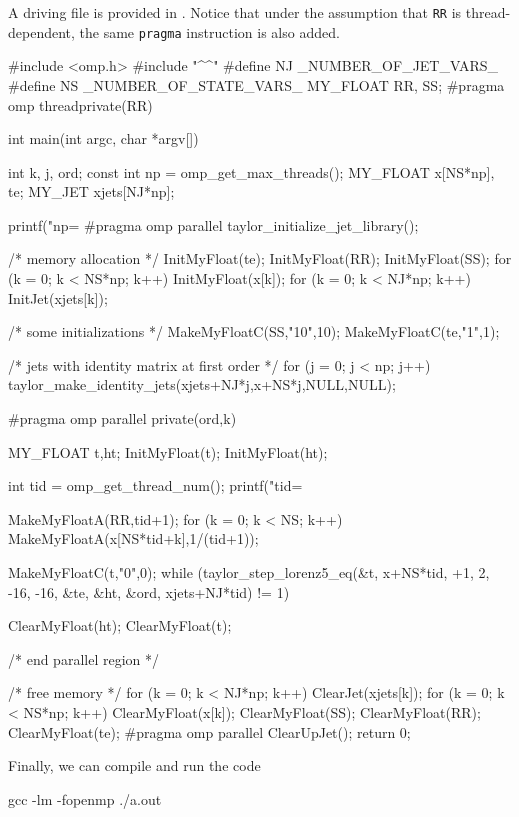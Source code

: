 \documentclass[10pt]{article}
\theoremstyle{remark}
\newcommand{\mainfile}{}
\newcommand{\odecfile}{}
\newcommand{\odehfile}{}
\begin{document}
\medskip
A driving file is provided in \mainfile{}. Notice that under the
assumption that \verb+RR+ is thread-dependent, the same \verb+pragma+
instruction is also added.

\begin{code}[title={File: \mainfile{}}]
    #include <omp.h>
    #include "^\odehfile{}^"
    #define NJ _NUMBER_OF_JET_VARS_
    #define NS _NUMBER_OF_STATE_VARS_
    MY_FLOAT RR, SS;
    #pragma omp threadprivate(RR)
    
    int main(int argc, char *argv[])
    {
      int k, j, ord;
      const int np = omp_get_max_threads();
      MY_FLOAT x[NS*np], te;
      MY_JET xjets[NJ*np];
    
      printf("np=%
    #pragma omp parallel
      taylor_initialize_jet_library();
      
      /* memory allocation */
      InitMyFloat(te); InitMyFloat(RR); InitMyFloat(SS);
      for (k = 0; k < NS*np; k++) {InitMyFloat(x[k]);}
      for (k = 0; k < NJ*np; k++) {InitJet(xjets[k]);}
      
      /* some initializations */
      MakeMyFloatC(SS,"10",10);
      MakeMyFloatC(te,"1",1);
      
      /* jets with identity matrix at first order */
      for (j = 0; j < np; j++) {taylor_make_identity_jets(xjets+NJ*j,x+NS*j,NULL,NULL);}
    
    #pragma omp parallel private(ord,k)
      {
        MY_FLOAT t,ht;
        InitMyFloat(t); InitMyFloat(ht);
    
        int tid = omp_get_thread_num();
        printf("tid=%
        
        MakeMyFloatA(RR,tid+1);
        for (k = 0; k < NS; k++) {MakeMyFloatA(x[NS*tid+k],1/(tid+1));}
    
        MakeMyFloatC(t,"0",0);
        while (taylor_step_lorenz5_eq(&t, x+NS*tid, +1, 2, -16, -16,
                                      &te, &ht, &ord, xjets+NJ*tid) != 1) {}
    
        ClearMyFloat(ht); ClearMyFloat(t);
      } /* end parallel region */
      
      /* free memory */
      for (k = 0; k < NJ*np; k++) {ClearJet(xjets[k]);}
      for (k = 0; k < NS*np; k++) {ClearMyFloat(x[k]);}
      ClearMyFloat(SS); ClearMyFloat(RR); ClearMyFloat(te);
    #pragma omp parallel
      ClearUpJet();
      return 0;
    }
\end{code}
Finally, we can compile  and run the code
\begin{command}
    gcc \mainfile{} \odecfile{} -lm -fopenmp
    ./a.out
\end{command}
\end{document}

